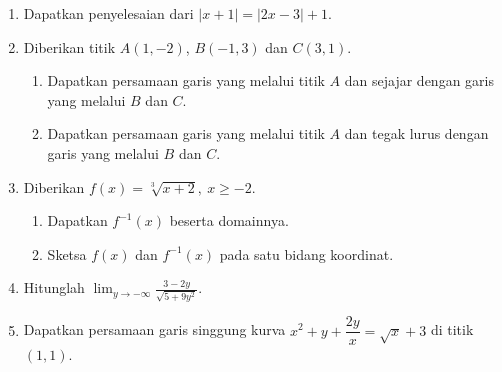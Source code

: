 \documentclass[10pt,openany,a4paper]{article}
\theoremstyle{definition}
\theoremstyle{definition}
\theoremstyle{plain}
\begin{document}
\begin{enumerate}
    \item Dapatkan penyelesaian dari $|x+1|=|2x-3|+1$.

    \item Diberikan titik $A(1,-2)$, $B(-1,3)$ dan $C(3,1)$.
    \begin{enumerate}
        \item Dapatkan persamaan garis yang melalui titik $A$ dan sejajar dengan garis yang melalui $B$ dan $C$.
        \item Dapatkan persamaan garis yang melalui titik $A$ dan tegak lurus dengan garis yang melalui $B$ dan $C$.
    \end{enumerate}

    \item Diberikan $f(x)=\sqrt[3]{x+2},\ x\geq -2$.
    \begin{enumerate}
        \item Dapatkan $f^{-1}(x)$ beserta domainnya.
        \item Sketsa $f(x)$ dan $f^{-1}(x)$ pada satu bidang koordinat.
    \end{enumerate}

    \item Hitunglah $\displaystyle\lim_{y\to-\infty}\frac{3-2y}{\sqrt{5+9y^2}}$.

    \item Dapatkan persamaan garis singgung kurva $x^2+y+\dfrac{2y}{x}=\sqrt{x}+3$ di titik $(1,1)$.
\end{enumerate}

\newpage
\end{document}

